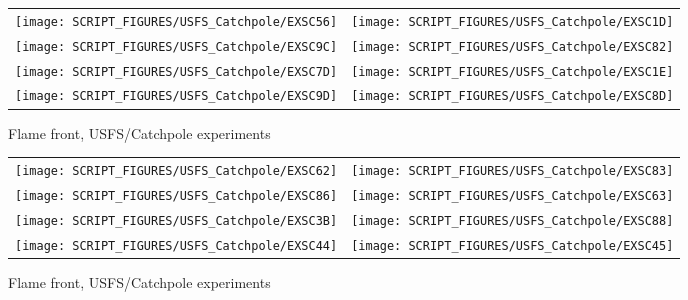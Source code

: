 \begin{figure}[p]
\begin{tabular*}{\textwidth}{l@{\extracolsep{\fill}}r}
\texttt{[image: SCRIPT\_FIGURES/USFS\_Catchpole/EXSC56]} &
\texttt{[image: SCRIPT\_FIGURES/USFS\_Catchpole/EXSC1D]} \\
\texttt{[image: SCRIPT\_FIGURES/USFS\_Catchpole/EXSC9C]} &
\texttt{[image: SCRIPT\_FIGURES/USFS\_Catchpole/EXSC82]} \\
\texttt{[image: SCRIPT\_FIGURES/USFS\_Catchpole/EXSC7D]} &
\texttt{[image: SCRIPT\_FIGURES/USFS\_Catchpole/EXSC1E]} \\
\texttt{[image: SCRIPT\_FIGURES/USFS\_Catchpole/EXSC9D]} &
\texttt{[image: SCRIPT\_FIGURES/USFS\_Catchpole/EXSC8D]} \\
\end{tabular*}
\caption[Flame front, USFS/Catchpole experiments]{Flame front, USFS/Catchpole experiments}
\label{USFS_Catchpole_088}
\end{figure}

\begin{figure}[p]
\begin{tabular*}{\textwidth}{l@{\extracolsep{\fill}}r}
\texttt{[image: SCRIPT\_FIGURES/USFS\_Catchpole/EXSC62]} &
\texttt{[image: SCRIPT\_FIGURES/USFS\_Catchpole/EXSC83]} \\
\texttt{[image: SCRIPT\_FIGURES/USFS\_Catchpole/EXSC86]} &
\texttt{[image: SCRIPT\_FIGURES/USFS\_Catchpole/EXSC63]} \\
\texttt{[image: SCRIPT\_FIGURES/USFS\_Catchpole/EXSC3B]} &
\texttt{[image: SCRIPT\_FIGURES/USFS\_Catchpole/EXSC88]} \\
\texttt{[image: SCRIPT\_FIGURES/USFS\_Catchpole/EXSC44]} &
\texttt{[image: SCRIPT\_FIGURES/USFS\_Catchpole/EXSC45]} \\
\end{tabular*}
\caption[Flame front, USFS/Catchpole experiments]{Flame front, USFS/Catchpole experiments}
\label{USFS_Catchpole_096}
\end{figure}

